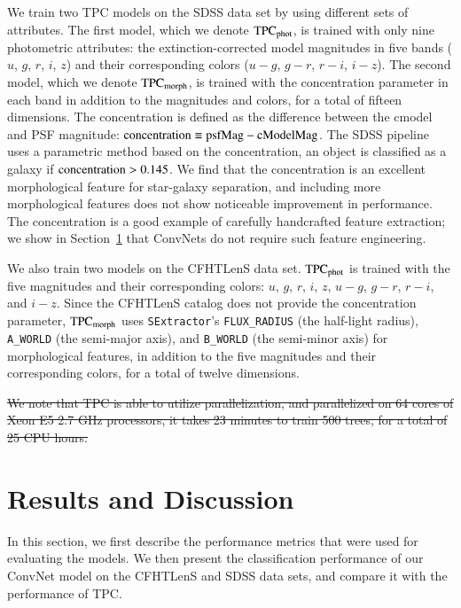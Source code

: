 \documentclass[fleqn,usenatbib]{mnras}
\begin{document}
We train two TPC models on the SDSS data set by using different sets of
attributes.
The first model, which we denote ${\mathrm{TPC}}_{{\mathrm{phot}}}$, is trained with
only nine photometric attributes:
the extinction-corrected model magnitudes in five bands
($u$, $g$, $r$, $i$, $z$)
and their corresponding colors
($u-g$, $g-r$, $r-i$, $i-z$).
The second model, which we denote ${\mathrm{TPC}}_{{\mathrm{morph}}}$, is trained with
the concentration parameter in each band in addition to the magnitudes and
colors, for a total of fifteen dimensions.
The concentration is defined as the difference between the cmodel
and PSF magnitude: ${\mathrm{concentration}}\equiv{\mathrm{psfMag}}-{\mathrm{cModelMag}}$.
The SDSS pipeline uses a parametric method based on the concentration,
an object is classified as a galaxy if ${\mathrm{concentration}}>0.145$.
We find that the concentration is an excellent morphological feature
for star-galaxy separation, and including more morphological features
does not show noticeable improvement in performance.
The concentration is a good example of carefully handcrafted feature extraction;
we show in Section~\ref{sec:results_and_discussion}
that ConvNets do not require such feature engineering.

We also train two models on the CFHTLenS data set.
${\mathrm{TPC}}_{{\mathrm{phot}}}$ is trained with 
the five magnitudes and their corresponding colors:
$u$, $g$, $r$, $i$, $z$, $u-g$, $g-r$, $r-i$, and $i-z$.
Since the CFHTLenS catalog does not provide the concentration parameter,
${\mathrm{TPC}}_{{\mathrm{morph}}}$ uses
\texttt{SExtractor}'s \texttt{FLUX\_RADIUS} (the half-light radius),
\texttt{A\_WORLD} (the semi-major axis), and \texttt{B\_WORLD}
(the semi-minor axis) for morphological features, in addition to
the five magnitudes and their corresponding colors,
for a total of twelve dimensions.

\sout{
We note that TPC is able to utilize parallelization, and parallelized on 64
cores of Xeon E5 2.7 GHz processors, it takes 23 minutes to train 500 trees,
for a total of 25 CPU hours.
}

\section{Results and Discussion}
  \label{sec:results_and_discussion}

In this section, we first describe the performance metrics that were used for
evaluating the models.
We then present the classification performance of our ConvNet model
on the CFHTLenS and SDSS data sets, and compare it with the performance of TPC.
\end{document}

